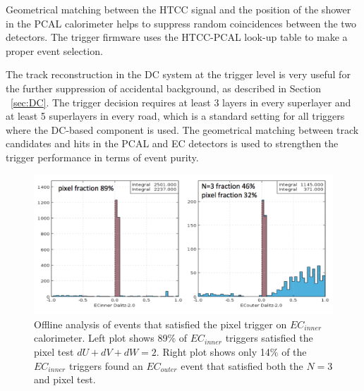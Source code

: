 Geometrical matching between the HTCC signal and the position of the shower in the PCAL calorimeter helps to suppress
random coincidences between the two detectors. The trigger firmware uses the HTCC-PCAL look-up table to make a proper event selection.

The track reconstruction in the DC system at the trigger level is very useful for the further suppression of accidental background, as described in Section ~\ref{sec:DC}. The trigger decision requires at least 3 layers in every superlayer and at least 5 superlayers in every road, which is a standard setting for all triggers where the DC-based component is used. The geometrical matching between track candidates and hits in the PCAL and EC detectors is used to strengthen the trigger performance in terms of event purity.



\begin{figure}[!htb]
 	\centering
  	\includegraphics[width=1.0\columnwidth,keepaspectratio]{img/PixelFraction.png}
 	\caption{Offline analysis of events that satisfied the pixel trigger on $EC_{inner}$  calorimeter.  Left plot shows 89$\%$ of $EC_{inner}$  triggers satisfied the pixel test $dU+dV+dW=2$.  Right plot shows only 14$\%$ of the $EC_{inner}$ triggers found an $EC_{outer}$ event that satisfied both the $N=3$ and pixel test.}
	\label{fig:rlectron}
\end{figure}


